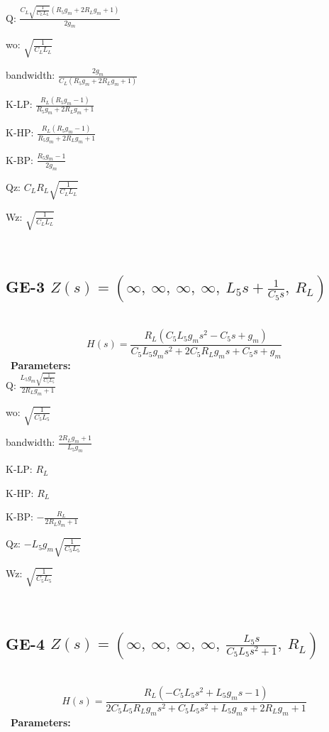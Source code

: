 \documentclass{article}
\begin{document}
Q: $\frac{C_{L} \sqrt{\frac{1}{C_{L} L_{L}}} \left(R_{5} g_{m} + 2 R_{L} g_{m} + 1\right)}{2 g_{m}}$\ 

wo: $\sqrt{\frac{1}{C_{L} L_{L}}}$\ 

bandwidth: $\frac{2 g_{m}}{C_{L} \left(R_{5} g_{m} + 2 R_{L} g_{m} + 1\right)}$\ 

K-LP: $\frac{R_{L} \left(R_{5} g_{m} - 1\right)}{R_{5} g_{m} + 2 R_{L} g_{m} + 1}$\ 

K-HP: $\frac{R_{L} \left(R_{5} g_{m} - 1\right)}{R_{5} g_{m} + 2 R_{L} g_{m} + 1}$\ 

K-BP: $\frac{R_{5} g_{m} - 1}{2 g_{m}}$\ 

Qz: $C_{L} R_{L} \sqrt{\frac{1}{C_{L} L_{L}}}$\ 

Wz: $\sqrt{\frac{1}{C_{L} L_{L}}}$\ 

\ 

\subsection{GE-3 $Z(s) = \left( \infty, \  \infty, \  \infty, \  \infty, \  L_{5} s + \frac{1}{C_{5} s}, \  R_{L}\right)$ } \ 
\textbf{\[H(s) = \frac{R_{L} \left(C_{5} L_{5} g_{m} s^{2} - C_{5} s + g_{m}\right)}{C_{5} L_{5} g_{m} s^{2} + 2 C_{5} R_{L} g_{m} s + C_{5} s + g_{m}}\] } \ 
\textbf{Parameters:}\\ 

Q: $\frac{L_{5} g_{m} \sqrt{\frac{1}{C_{5} L_{5}}}}{2 R_{L} g_{m} + 1}$\ 

wo: $\sqrt{\frac{1}{C_{5} L_{5}}}$\ 

bandwidth: $\frac{2 R_{L} g_{m} + 1}{L_{5} g_{m}}$\ 

K-LP: $R_{L}$\ 

K-HP: $R_{L}$\ 

K-BP: $- \frac{R_{L}}{2 R_{L} g_{m} + 1}$\ 

Qz: $- L_{5} g_{m} \sqrt{\frac{1}{C_{5} L_{5}}}$\ 

Wz: $\sqrt{\frac{1}{C_{5} L_{5}}}$\ 

\ 

\subsection{GE-4 $Z(s) = \left( \infty, \  \infty, \  \infty, \  \infty, \  \frac{L_{5} s}{C_{5} L_{5} s^{2} + 1}, \  R_{L}\right)$ } \ 
\textbf{\[H(s) = \frac{R_{L} \left(- C_{5} L_{5} s^{2} + L_{5} g_{m} s - 1\right)}{2 C_{5} L_{5} R_{L} g_{m} s^{2} + C_{5} L_{5} s^{2} + L_{5} g_{m} s + 2 R_{L} g_{m} + 1}\] } \ 
\textbf{Parameters:}\\ 
\end{document}
